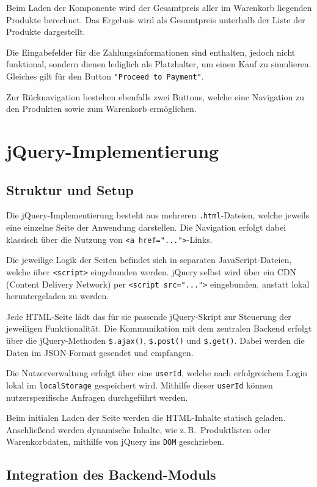 \documentclass[oneside]{ausarbeitung}
\begin{document}
Beim Laden der Komponente wird der Gesamtpreis aller im Warenkorb liegenden Produkte berechnet. Das Ergebnis wird als Gesamtpreis unterhalb der Liste der Produkte dargestellt. 

Die Eingabefelder für die Zahlungsinformationen sind enthalten, jedoch nicht funktional, sondern dienen lediglich als Platzhalter, um einen Kauf zu simulieren. Gleiches gilt für den Button \texttt{"Proceed to Payment"}.

Zur Rücknavigation bestehen ebenfalls zwei Buttons, welche eine Navigation zu den Produkten sowie zum Warenkorb ermöglichen.
 

\section{jQuery-Implementierung}

\subsection{Struktur und Setup}

Die jQuery-Implementierung besteht aus mehreren \texttt{.html}-Dateien, welche jeweils eine einzelne Seite der Anwendung darstellen. Die Navigation erfolgt dabei klassisch über die Nutzung von \texttt{<a href="...">}-Links.

Die jeweilige Logik der Seiten befindet sich in separaten JavaScript-Dateien, welche über \texttt{<script>} eingebunden werden. jQuery selbst wird über ein CDN (Content Delivery Network) per \texttt{<script src="...">} eingebunden, anstatt lokal heruntergeladen zu werden.

Jede HTML-Seite lädt das für sie passende jQuery-Skript zur Steuerung der jeweiligen Funktionalität. Die Kommunikation mit dem zentralen Backend erfolgt über die jQuery-Methoden \texttt{\$.\allowbreak ajax()}, \texttt{\$.\allowbreak post()} und \texttt{\$.\allowbreak get()}. Dabei werden die Daten im JSON-Format gesendet und empfangen.

Die Nutzerverwaltung erfolgt über eine \texttt{userId}, welche nach erfolgreichem Login lokal im \texttt{localStorage} gespeichert wird. Mithilfe dieser \texttt{userId} können nutzerspezifische Anfragen durchgeführt werden.

Beim initialen Laden der Seite werden die HTML-Inhalte statisch geladen. Anschließend werden dynamische Inhalte, wie z.\,B.\ Produktlisten oder Warenkorbdaten, mithilfe von jQuery ins \texttt{DOM} geschrieben.

\subsection{Integration des Backend-Moduls}
\end{document}
